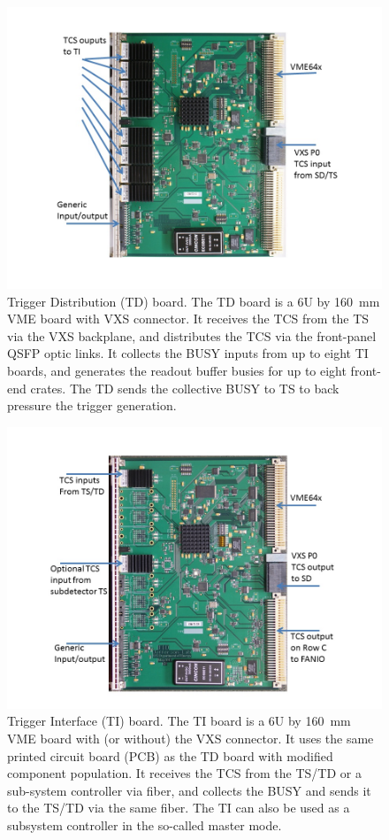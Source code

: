 \begin{figure}[hbt]
	\centering
	\includegraphics[width=1.0\columnwidth,keepaspectratio]{img/TDused.jpg}
	\caption{Trigger Distribution (TD) board.  The TD board is a 6U by 160~mm VME board with VXS connector.  It receives the TCS from the TS via the VXS backplane, and distributes the TCS via the front-panel QSFP optic links.  It collects the BUSY inputs from up to eight TI boards, and generates the readout buffer busies for up to eight front-end crates.  The TD sends the collective BUSY to TS to back pressure the trigger generation.}
	\label{fig:TDused}
\end{figure}

\begin{figure}[hbt]
	\centering
	\includegraphics[width=1.0\columnwidth,keepaspectratio]{img/TIused.jpg}
	\caption{Trigger Interface (TI) board.  The TI board is a 6U by 160~mm VME board with (or without) the VXS connector.  It uses the same printed circuit board (PCB) as the TD board with modified component population.  It receives the TCS from the TS/TD or a sub-system controller via fiber, and collects the BUSY and sends it to the TS/TD via the same fiber.  The TI can also be used as a subsystem controller in the so-called master mode.}
	\label{fig:TIused}
\end{figure}

